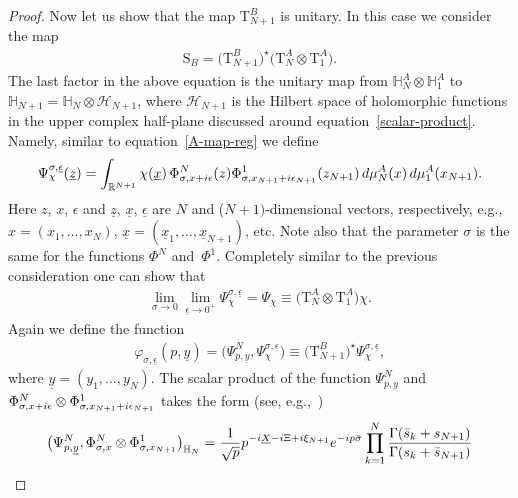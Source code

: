 \documentclass[11pt]{article}
\numberwithin{equation}{section}
\numberwithin{equation}{section}
\begin{document}
\begin{proof}
Now let us show that the map $\mathrm T_{N+1}^B$ is unitary. In this case we consider the map
\begin{gather*}
\mathrm S_{B}=\big(\mathrm T_{N+1}^{B}\big)^{\star}\big(\mathrm T_{N}^A\otimes \mathrm T_1^A\big).
\end{gather*}
The last factor in the above equation is the unitary map from $\mathbb H_N^A\otimes \mathbb H_1^A$ to $\mathbb H_{N+1}=\mathbb
H_N\otimes\mathcal H_{N+1}$, where $\mathcal H_{N+1}$ is the Hilbert space of holomorphic functions in the upper complex half-plane
discussed around equation~\eqref{scalar-product}. Namely, similar to equation~\eqref{A-map-reg} we define
\begin{gather*}
\Psi^{\sigma,\underline{\epsilon}}_{\chi}(\underline{z})
=\int_{\mathbb R^{N+1}} \chi(\underline{x})\, \Phi^N_{{\sigma,x+{\rm i}\epsilon}}(z)\Phi^1_{{\sigma,x_{N+1}+{\rm i}\epsilon_{N+1}}}(z_{N+1})
\, {\rm d}\mu_{N}^{A}( x)\, {\rm d}\mu_1^A(x_{N+1}).
\end{gather*}
Here $z$, $x$, $\epsilon$ and $\underline z$, $\underline x$, $\underline \epsilon$ are $N$ and ($N+1)$-dimensional vectors, respectively, e.g.,
$x=(x_1,\dots,x_N)$, $\underline x=(\underline x_1,\dots,\underline x_{N+1})$, etc. Note also that the parameter $\sigma$ is the
same for the functions $\Phi^N$ and~$\Phi^1$. Completely similar to the previous consideration one can show that
\begin{gather*}
\lim_{\sigma\to0} \lim_{\underline{\epsilon}\to 0^+} \Psi^{\sigma,\underline{\epsilon}}_{\chi}
 =\Psi_{\chi} \equiv \big(\mathrm T_{N}^A\otimes \mathrm T_1^A\big)\chi.
\end{gather*}
Again we define the function
\begin{gather*}
\varphi_{\sigma,\underline \epsilon}(p,\underline y)
=\big(\Psi^N_{p,\underline y},\Psi^{\sigma,\underline\epsilon}_\chi\big)
\equiv \big(\mathrm T_{N+1}^{B}\big)^{\star} \Psi^{\sigma,\underline{\epsilon}}_{\chi},
\end{gather*}
where $\underline y =(y_1,\dots,y_N)$. The scalar product of the function $\Psi^N_{p,\underline y}$ and $\Phi^N_{{\sigma,x+{\rm i}\epsilon}}\otimes\Phi^1_{\sigma,x_{N+1}+{\rm i}\epsilon_{N+1}}$ takes the form (see, e.g.,~\cite{DMspinchainandSL2RGustafson})
\begin{gather*}
\big(\Psi^N_{p,\underline y},\Phi^N_{{\sigma,x}}\otimes\Phi^1_{\sigma,x_{N+1}}\big)_{\mathbb H_N} =
\frac1{\sqrt{p}} p^{-{\rm i}\underline X-{\rm i}\Xi +{\rm i}\xi_{N+1}} {\rm e}^{-{\rm i}p\bar\sigma}
\prod_{k=1}^N \frac{\Gamma(\bar s_k+s_{N+1})}{\Gamma(s_k+\bar s_{N+1})}

\end{gather*}
\end{proof}
\end{document}
